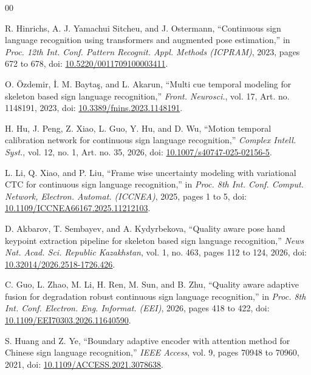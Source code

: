 \documentclass[conference]{IEEEtran}
\begin{document}
\begin{thebibliography}{00}

R. Hinrichs, A. J. Yamachui Sitcheu, and J. Ostermann,
``Continuous sign language recognition using transformers and augmented pose estimation,''
in \textit{Proc. 12th Int. Conf. Pattern Recognit. Appl. Methods (ICPRAM)}, 2023, pages 672 to 678,
doi: \href{https://doi.org/10.5220/0011709100003411}{10.5220/0011709100003411}.

O. {\"O}zdemir, {\.I}. M. Bayta{\c{s}}, and L. Akarun,
``Multi cue temporal modeling for skeleton based sign language recognition,''
\textit{Front. Neurosci.}, vol. 17, Art. no. 1148191, 2023,
doi: \href{https://doi.org/10.3389/fnins.2023.1148191}{10.3389/fnins.2023.1148191}.

H. Hu, J. Peng, Z. Xiao, L. Guo, Y. Hu, and D. Wu,
``Motion temporal calibration network for continuous sign language recognition,''
\textit{Complex Intell. Syst.}, vol. 12, no. 1, Art. no. 35, 2026,
doi: \href{https://doi.org/10.1007/s40747-025-02156-5}{10.1007/s40747-025-02156-5}.

L. Li, Q. Xiao, and P. Liu,
``Frame wise uncertainty modeling with variational CTC for continuous sign language recognition,''
in \textit{Proc. 8th Int. Conf. Comput. Network, Electron. Automat. (ICCNEA)}, 2025, pages 1 to 5,
doi: \href{https://doi.org/10.1109/ICCNEA66167.2025.11212103}{10.1109/ICCNEA66167.2025.11212103}.

D. Akbarov, T. Sembayev, and A. Kydyrbekova,
``Quality aware pose hand keypoint extraction pipeline for skeleton based sign language recognition,''
\textit{News Nat. Acad. Sci. Republic Kazakhstan}, vol. 1, no. 463, pages 112 to 124, 2026,
doi: \href{https://doi.org/10.32014/2026.2518-1726.426}{10.32014/2026.2518-1726.426}.

C. Guo, L. Zhao, M. Li, H. Ren, M. Sun, and B. Zhu,
``Quality aware adaptive fusion for degradation robust continuous sign language recognition,''
in \textit{Proc. 8th Int. Conf. Electron. Eng. Informat. (EEI)}, 2026, pages 418 to 422,
doi: \href{https://doi.org/10.1109/EEI70303.2026.11640590}{10.1109/EEI70303.2026.11640590}.

S. Huang and Z. Ye,
``Boundary adaptive encoder with attention method for Chinese sign language recognition,''
\textit{IEEE Access}, vol. 9, pages 70948 to 70960, 2021,
doi: \href{https://doi.org/10.1109/ACCESS.2021.3078638}{10.1109/ACCESS.2021.3078638}.


\end{thebibliography}
\end{document}
